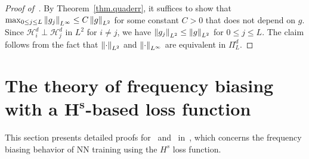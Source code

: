 

\begin{proof}[Proof of~]
By Theorem~\ref{thm.quaderr}, it suffices to show that $\max_{0 \leq j \leq L} \left\lVert g_j\right\rVert_{L^\infty} \leq C \left\lVert g\right\rVert_{L^2}$ for some constant $C > 0$ that does not depend on $g$. Since $\mathcal{H}_i^d \perp \mathcal{H}_j^d$ in $L^2$ for $i \neq j$, we have $\left\lVert g_j\right\rVert_{L^2} \leq \left\lVert g\right\rVert_{L^2}$ for $0 \leq j \leq L$. The claim follows from the fact that $\left\lVert\cdot\right\rVert_{L^2}$ and $\left\lVert\cdot\right\rVert_{L^\infty}$ are equivalent in $\Pi_L^d$.
\end{proof}



\section{The theory of frequency biasing with a $\mathbf{H^s}$-based loss function}\label{sec:sobNN}
This section presents detailed proofs for~ and~ in~, which concerns the frequency biasing behavior of NN training using the $H^s$ loss function. 

